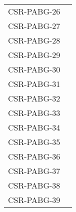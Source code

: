 \begin{longtable}{|p{1.5cm}|p{12cm}|@{}}
\begin{minipage}{12cm}
\end{minipage}\\
\hline
CSR-PABG-26&
\begin{minipage}{12cm}
\end{minipage}\\
\hline
CSR-PABG-27&
\begin{minipage}{12cm}
\end{minipage}\\
\hline
CSR-PABG-28&
\begin{minipage}{12cm}
\end{minipage}\\
\hline
CSR-PABG-29&
\begin{minipage}{12cm}
\end{minipage}\\
\hline
CSR-PABG-30&
\begin{minipage}{12cm}
\end{minipage}\\
\hline
CSR-PABG-31&
\begin{minipage}{12cm}
\end{minipage}\\
\hline
CSR-PABG-32&
\begin{minipage}{12cm}
\end{minipage}\\
\hline
CSR-PABG-33&
\begin{minipage}{12cm}
\end{minipage}\\
\hline
CSR-PABG-34&
\begin{minipage}{12cm}
\end{minipage}\\
\hline
CSR-PABG-35&
\begin{minipage}{12cm}
\end{minipage}\\
\hline
CSR-PABG-36&
\begin{minipage}{12cm}
\end{minipage}\\
\hline
CSR-PABG-37&
\begin{minipage}{12cm}
\end{minipage}\\
\hline
CSR-PABG-38&
\begin{minipage}{12cm}
\end{minipage}\\
\hline
CSR-PABG-39&
\begin{minipage}{12cm}
\end{minipage}\\

\end{longtable}
